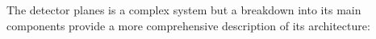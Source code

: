 		The detector planes is a complex system but a breakdown into its main components provide a more comprehensive description of its architecture: 
%				
